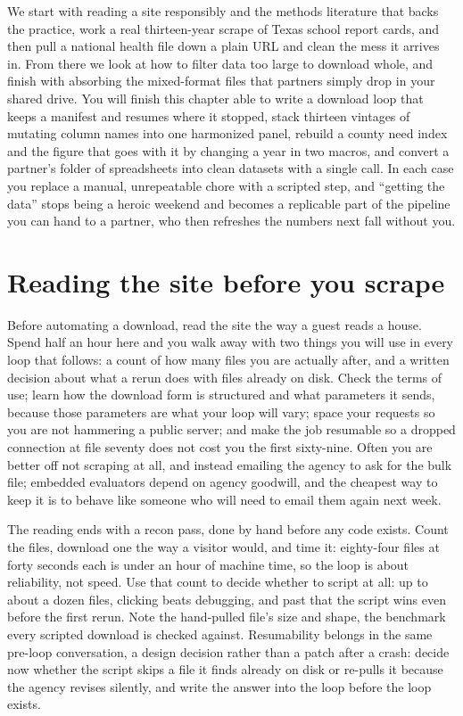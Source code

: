 \documentclass[
    a4paper,
    fontsize=10pt,
    twoside=true,
    numbers=noenddot,
]{kaobook}
\begin{document}
We start with reading a site responsibly and the methods literature that backs the practice, work a real thirteen-year scrape of Texas school report cards, and then pull a national health file down a plain URL and clean the mess it arrives in. From there we look at how to filter data too large to download whole, and finish with absorbing the mixed-format files that partners simply drop in your shared drive. You will finish this chapter able to write a download loop that keeps a manifest and resumes where it stopped, stack thirteen vintages of mutating column names into one harmonized panel, rebuild a county need index and the figure that goes with it by changing a year in two macros, and convert a partner's folder of spreadsheets into clean datasets with a single call. In each case you replace a manual, unrepeatable chore with a scripted step, and \enquote{getting the data} stops being a heroic weekend and becomes a replicable part of the pipeline you can hand to a partner, who then refreshes the numbers next fall without you.

\section{Reading the site before you scrape}
Before automating a download, read the site the way a guest reads a house. Spend half an hour here and you walk away with two things you will use in every loop that follows: a count of how many files you are actually after, and a written decision about what a rerun does with files already on disk. Check the terms of use; learn how the download form is structured and what parameters it sends, because those parameters are what your loop will vary; space your requests so you are not hammering a public server; and make the job resumable so a dropped connection at file seventy does not cost you the first sixty-nine. Often you are better off not scraping at all, and instead emailing the agency to ask for the bulk file; embedded evaluators depend on agency goodwill, and the cheapest way to keep it is to behave like someone who will need to email them again next week.

The reading ends with a recon pass, done by hand before any code exists. Count the files, download one the way a visitor would, and time it: eighty-four files at forty seconds each is under an hour of machine time, so the loop is about reliability, not speed. Use that count to decide whether to script at all: up to about a dozen files, clicking beats debugging, and past that the script wins even before the first rerun. Note the hand-pulled file's size and shape, the benchmark every scripted download is checked against. Resumability belongs in the same pre-loop conversation, a design decision rather than a patch after a crash: decide now whether the script skips a file it finds already on disk or re-pulls it because the agency revises silently, and write the answer into the loop before the loop exists.
\end{document}
